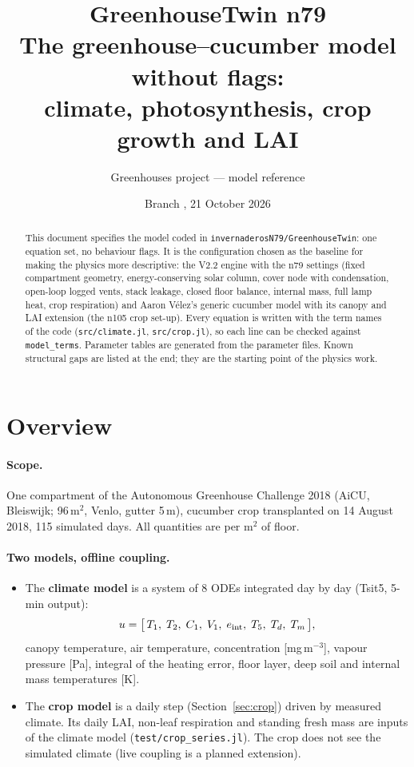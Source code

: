 \documentclass[11pt,a4paper]{article}
\title{\textbf{GreenhouseTwin n79}\\[4pt]\large The greenhouse--cucumber model without flags:\\
climate, photosynthesis, crop growth and LAI}
\author{Greenhouses project --- model reference}
\date{Branch \code{n79}, 21 October 2026}
\newcommand{\code}[1]{\texttt{#1}}
\begin{document}
\maketitle
\begin{abstract}
\noindent This document specifies the model coded in \code{invernaderosN79/GreenhouseTwin}: one equation set, no
behaviour flags. It is the configuration chosen as the baseline for making the physics more descriptive: the V2.2
engine with the n79 settings (fixed compartment geometry, energy-conserving solar column, cover node with
condensation, open-loop logged vents, stack leakage, closed floor balance, internal mass, full lamp heat, crop
respiration) and Aaron V\'elez's generic cucumber model with its canopy and LAI extension (the n105 crop set-up).
Every equation is written with the term names of the code (\code{src/climate.jl}, \code{src/crop.jl}), so each line can
be checked against \code{model\_terms}. Parameter tables are generated from the parameter files. Known structural
gaps are listed at the end; they are the starting point of the physics work.
\end{abstract}
\tableofcontents

\section{Overview}\label{sec:overview}
\paragraph{Scope.} One compartment of the Autonomous Greenhouse Challenge 2018 (AiCU, Bleiswijk; 96\,m$^2$, Venlo, gutter
5\,m), cucumber crop transplanted on 14 August 2018, 115 simulated days. All quantities are per m$^2$ of floor.

\paragraph{Two models, offline coupling.}
\begin{itemize}[nosep]
\item The \textbf{climate model} is a system of 8 ODEs integrated day by day (Tsit5, 5-min output):
\begin{equation}
u=\bigl[\,T_1,\;T_2,\;C_1,\;V_1,\;e_{\rm int},\;T_5,\;T_d,\;T_m\,\bigr],
\end{equation}
canopy temperature, air temperature,  concentration [mg\,m$^{-3}$], vapour pressure [Pa], integral of the heating error,
floor layer, deep soil and internal mass temperatures [K].
\item The \textbf{crop model} is a daily step (Section~\ref{sec:crop}) driven by measured climate. Its daily LAI, non-leaf
respiration and standing fresh mass are inputs of the climate model (\code{test/crop\_series.jl}). The crop does not see
the simulated climate (live coupling is a planned extension).
\end{itemize}
\end{document}
